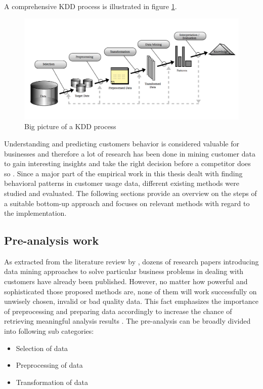 A comprehensive KDD process is illustrated in figure \ref{fig:kddProcess}.

\begin{figure}
	\centering
	\includegraphics[width=1.0\textwidth]{img/kdd.png}
	\caption{Big picture of a KDD process \cite{fayyad1996data}}
	\label{fig:kddProcess}
\end{figure} 

Understanding and predicting customers behavior is considered valuable for businesses and therefore a lot of research has been done in mining customer data to gain interesting insights and take the right decision before a competitor does so \cite{Ngai2009}. Since a major part of the empirical work in this thesis dealt with finding behavioral patterns in customer usage data, different existing methods were studied and evaluated. The following sections provide an overview on the steps of a suitable bottom-up approach and focuses on relevant methods with regard to the implementation.

\subsection{Pre-analysis work}
As extracted from the literature review by \cite{Ngai2009}, dozens of research papers introducing data mining approaches to solve particular business problems in dealing with customers have already been published. However, no matter how powerful and sophisticated those proposed methods are, none of them will work successfully on unwisely chosen, invalid or bad quality data. This fact emphasizes the importance of preprocessing and preparing data accordingly to increase the chance of retrieving meaningful analysis results \cite{neckel2015} \cite{knobloch2000data}. The pre-analysis can be broadly divided into following sub categories:

\begin{itemize}
	\item Selection of data
	\item Preprocessing of data
	\item Transformation of data
\end{itemize}

